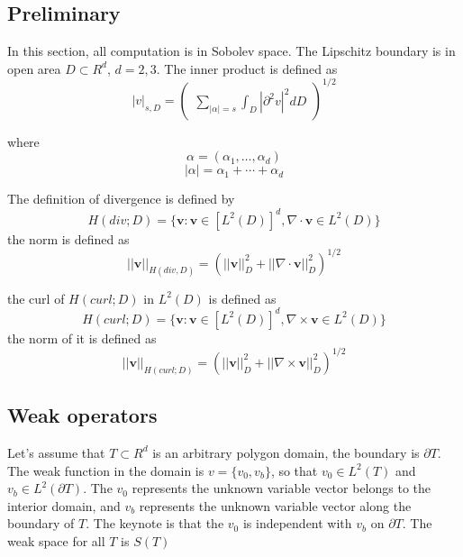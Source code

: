 \subsection{Preliminary}
In this section, all computation is in Sobolev space\cite{brenner2007mathematical, ciarlet2002finite}. The Lipschitz boundary is in open area $ D \subset R^{d} $, $ d = 2, 3 $. The inner product is defined as
\begin{equation}
|v|_{s, D} = \begin{pmatrix}
\sum_{|\alpha| = s} \int_{D} |\partial^{2} v|^{2} dD
\end{pmatrix}^{1/2}
\end{equation}

where
\begin{equation}
\alpha = (\alpha_{1}, \dots, \alpha_{d})
\end{equation}
\begin{equation}
|\alpha| = \alpha_{1} + \cdots + \alpha_d
\end{equation}

The definition of divergence is defined by
\begin{equation}
H(div; D) = \{ \mathbf{v} : \mathbf{v} \in [L^{2}(D)]^{d}, \nabla \cdot \mathbf{v} \in L^{2}(D) \}
\end{equation}
the norm is defined as
\begin{equation}
||\mathbf{v}||_{H(div, D)} = (||\mathbf{v}||^{2}_{D} + ||\nabla \cdot \mathbf{v}||^{2}_{D})^{1/2}
\end{equation}

the curl of $ H(curl; D) $ in $ L^{2}(D) $ is defined as
\begin{equation}
H(curl; D) = \{\mathbf{v} : \mathbf{v} \in [L^{2}(D)]^{d}, \nabla \times \mathbf{v} \in L^{2}(D)\}
\end{equation}
the norm of it is defined as
\begin{equation}
||\mathbf{v}||_{H(curl; D)} = (||\mathbf{v}||^{2}_{D} + ||\nabla \times \mathbf{v}||^{2}_{D})^{1/2}
\end{equation}

\subsection{Weak operators}

Let's assume that $ T \subset R^{d} $ is an arbitrary polygon domain, the boundary is $ \partial T $. The weak function in the domain is $ v = \{v_{0}, v_{b}\} $, so that $ v_{0} \in L^{2}(T) $ and $ v_{b} \in L^{2} (\partial T) $. The $ v_{0} $ represents the unknown variable vector belongs to the interior domain, and $ v_{b} $ represents the unknown variable vector along the boundary of $ T $. The keynote is that the $ v_{0}  $ is independent with $ v_{b} $ on $ \partial T $. The weak space for all $ T $ is $ S(T) $

